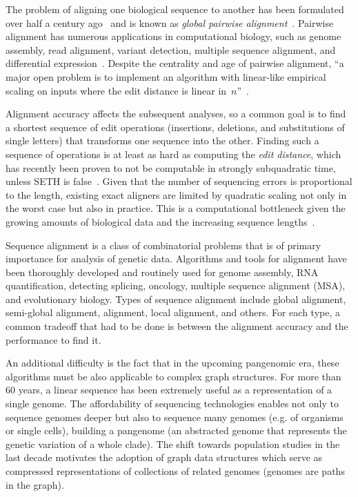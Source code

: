 The problem of aligning one biological sequence to another has been formulated
over half a century ago~\citep{needleman1970general} and is known as
\emph{global pairwise alignment}~\citep{navarro2001guided}. Pairwise alignment
has numerous applications in computational biology, such as genome assembly,
read alignment, variant detection, multiple sequence alignment, and differential
expression~\citep{prjibelski2018sequence}. Despite the centrality and age of
pairwise alignment, ``a major open problem is to implement an algorithm with linear-like
empirical scaling on inputs where the edit distance is linear
in~$n$''~\citep{medvedev2022theoretical}.

Alignment accuracy affects the subsequent analyses, so a common goal
is to find a shortest sequence of edit operations (insertions, deletions, and
substitutions of single letters) that transforms one sequence into the other.
Finding such a sequence of operations is at least as hard as computing the \emph{edit
distance}, which has recently been proven to not be computable in strongly
subquadratic time, unless SETH is false~\citep{backurs2015edit}. Given that
the number of sequencing errors is proportional to the length, existing exact aligners are
limited by quadratic scaling not only in the worst case but also in practice.
This is a computational bottleneck given the growing amounts of biological data
and the increasing sequence lengths~\citep{kucherov2019evolution}.

Sequence alignment is a class of combinatorial problems that is of primary
importance for analysis of genetic data. Algorithms and tools for alignment have
been thoroughly developed and routinely used for genome assembly, RNA
quantification, detecting splicing, oncology, multiple sequence alignment (MSA),
and evolutionary biology. Types of sequence alignment include global alignment,
semi-global alignment, alignment, local alignment, and others. For each type, a
common tradeoff that had to be done is between the alignment accuracy and the
performance to find it.

An additional difficulty is the fact that in the
upcoming pangenomic era, these algorithms must be also applicable to complex
graph structures. For more than 60 years, a linear sequence has been extremely
useful as a representation of a single genome. The affordability of sequencing
technologies enables not only to sequence genomes deeper but also to sequence
many genomes (e.g. of organisms or single cells), building a pangenome (an
abstracted genome that represents the genetic variation of a whole clade). The
shift towards population studies in the last decade motivates the adoption of
graph data structures which serve as compressed representations of collections
of related genomes (genomes are paths in the graph).

